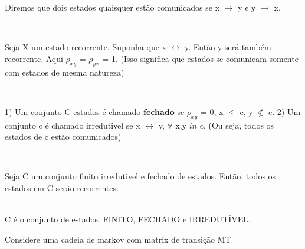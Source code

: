 \documentclass[]{article}
\theoremstyle{definition}
\theoremstyle{definition}
\theoremstyle{definition}
\theoremstyle{remark}
\let\BeginKnitrBlock\begin \let\EndKnitrBlock\end
\begin{document}
\BeginKnitrBlock{definition}
\protect\hypertarget{def:unnamed-chunk-38}{}{\label{def:unnamed-chunk-38}
}Diremos que dois estados quaisquer estão comunicados se x
\(\rightarrow\) y e y \(\rightarrow\) x.
\EndKnitrBlock{definition}\\
\BeginKnitrBlock{theorem}
\protect\hypertarget{thm:unnamed-chunk-39}{}{\label{thm:unnamed-chunk-39}
}Seja X um estado recorrente. Suponha que x \(\leftrightarrow\) y. Então
y será também recorrente. Aqui \(\rho_{xy}\) = \(\rho_{yx}\) = 1. (Isso
significa que estados se comunicam somente com estados de mesma
natureza)
\EndKnitrBlock{theorem}\\
\BeginKnitrBlock{definition}
\protect\hypertarget{def:unnamed-chunk-40}{}{\label{def:unnamed-chunk-40}
}1) Um conjunto C estados é chamado \textbf{fechado} se \(\rho_{xy}\) =
0, x \(\leq\) c, y \(\notin\) c. 2) Um conjunto c é chamado irredutivel
se x \(\leftrightarrow\) y, \(\forall\) x,y \(in\) c. (Ou seja, todos os
estados de c estão comunicados)
\EndKnitrBlock{definition}\\
\BeginKnitrBlock{theorem}
\protect\hypertarget{thm:unnamed-chunk-41}{}{\label{thm:unnamed-chunk-41}
}Seja C um conjunto finito irredutivel e fechado de estados. Então,
todos os estados em C serão recorrentes.
\EndKnitrBlock{theorem}\\
C é o conjunto de estados. FINITO, FECHADO e IRREDUTÍVEL.\\
\BeginKnitrBlock{example}
\protect\hypertarget{exm:unnamed-chunk-42}{}{\label{exm:unnamed-chunk-42} }
Considere uma cadeia de markov com matrix de transição MT
\EndKnitrBlock{example}
\end{document}
